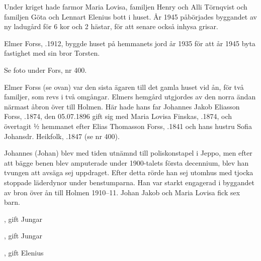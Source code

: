 Under kriget hade farmor Maria Lovisa, familjen Henry och Alli Törnqvist och familjen Göta och Lennart Elenius bott i huset. År 1945 påbörjades byggandet av ny ladugård för 6 kor och 2 hästar, för att senare också inhysa grisar.
\begin{jhchildren}
  \item {}
  \item {}
  \item {}
  \item {}
\end{jhchildren}


Elmer Forss, .1912, byggde huset på hemmanets jord år 1935 för att år 1945 byta fastighet med sin bror Torsten.



Se foto under Fors, nr 400.

Elmer Forss (se ovan) var den sista ägaren till det gamla huset vid ån, för två familjer, som revs i två omgångar. Elmers hemgård utgjordes av den norra ändan närmast åbron över till Holmen. Här hade hans far Johannes Jakob Eliasson Forss, .1874, den 05.07.1896 gift sig med Maria Lovisa Finskas, .1874, och övertagit ½ hemmanet efter Elias Thomasson Forss, .1841 och hans hustru Sofia Johansdr. Heikfolk, .1847 (se nr 400).

Johannes (Johan) blev med tiden utnämnd till poliskonstapel i Jeppo, men efter att bägge benen blev amputerade under 1900-talets första decennium, blev han tvungen att avsäga sej uppdraget. Efter detta rörde han sej utomhus med tjocka stoppade läderdynor under benstumparna. Han var starkt engagerad i byggandet av bron över ån till Holmen 1910--11.
Johan Jakob och Maria Lovisa fick sex barn.
\begin{jhchildren}
  \item {}, gift Jungar
  \item {}
  \item {}, gift Jungar
  \item {}
  \item {}
  \item {}, gift Elenius
\end{jhchildren}

